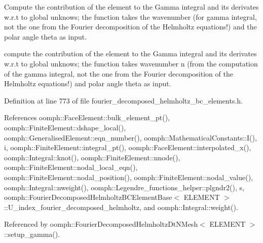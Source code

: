 Compute the contribution of the element to the Gamma integral and its derivates w.\+r.\+t to global unknows; the function takes the wavenumber (for gamma integral, not the one from the Fourier decomposition of the Helmholtz equations!) and the polar angle theta as input. 

compute the contribution of the element to the Gamma integral and its derivates w.\+r.\+t to global unknows; the function takes wavenumber n (from the computation of the gamma integral, not the one from the Fourier decomposition of the Helmholtz equations!) and polar angle theta as input. 

Definition at line 773 of file fourier\+\_\+decomposed\+\_\+helmholtz\+\_\+bc\+\_\+elements.\+h.



References oomph\+::\+Face\+Element\+::bulk\+\_\+element\+\_\+pt(), oomph\+::\+Finite\+Element\+::dshape\+\_\+local(), oomph\+::\+Generalised\+Element\+::eqn\+\_\+number(), oomph\+::\+Mathematical\+Constants\+::\+I(), i, oomph\+::\+Finite\+Element\+::integral\+\_\+pt(), oomph\+::\+Face\+Element\+::interpolated\+\_\+x(), oomph\+::\+Integral\+::knot(), oomph\+::\+Finite\+Element\+::nnode(), oomph\+::\+Finite\+Element\+::nodal\+\_\+local\+\_\+eqn(), oomph\+::\+Finite\+Element\+::nodal\+\_\+position(), oomph\+::\+Finite\+Element\+::nodal\+\_\+value(), oomph\+::\+Integral\+::nweight(), oomph\+::\+Legendre\+\_\+functions\+\_\+helper\+::plgndr2(), s, oomph\+::\+Fourier\+Decomposed\+Helmholtz\+B\+C\+Element\+Base$<$ E\+L\+E\+M\+E\+N\+T $>$\+::\+U\+\_\+index\+\_\+fourier\+\_\+decomposed\+\_\+helmholtz, and oomph\+::\+Integral\+::weight().



Referenced by oomph\+::\+Fourier\+Decomposed\+Helmholtz\+Dt\+N\+Mesh$<$ E\+L\+E\+M\+E\+N\+T $>$\+::setup\+\_\+gamma().

\mbox{\label{classoomph_1_1FourierDecomposedHelmholtzDtNBoundaryElement_a05f4242ac8ee12f5a765bf7eff896e60}} 
